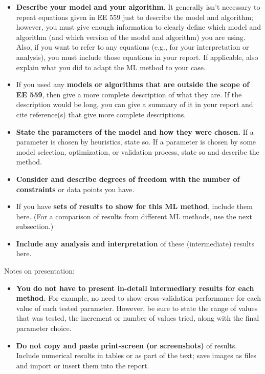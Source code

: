 \documentclass[singlecolumn]{article}
\begin{document}
\begin{itemize}
	\item \textbf{Describe your model and your algorithm}. It generally isn't necessary to repeat equations given in EE 559 just to describe the model and algorithm; however, you must give enough information to clearly define which model and algorithm (and which version of the model and algorithm) you are using. Also, if you want to refer to any equations (e.g., for your interpretation or analysis), you must include those equations in your report. If applicable, also explain what you did to adapt the ML method to your case. 
	\item If you used any \textbf{models or algorithms that are outside the scope of EE 559}, then give a more complete description of what they are.  If the description would be long, you can give a summary of it in your report and cite reference(s) that give more complete descriptions.
	\item \textbf{State the parameters of the model and how they were chosen.} If a parameter is chosen by heuristics, state so. If a parameter is chosen by some model selection, optimization, or validation process, state so and describe the method. 
	\item \textbf{Consider and describe degrees of freedom with the number of constraints} or data points you have. 
	\item If you have \textbf{sets of results to show for this ML method}, include them here. (For a comparison of results from different ML methods, use the next subsection.) 
	\item \textbf{Include any analysis and interpretation} of these (intermediate) results here.
\end{itemize}

Notes on presentation:
\begin{itemize}
	\item \textbf{You do not have to present in-detail intermediary results for each method.} For example, no need to show cross-validation performance for each value of each tested parameter. However, be sure to state the range of values that was tested, the increment or number of values tried, along with the final parameter choice.
	\item \textbf{Do not copy and paste print-screen (or screenshots)} of results. Include numerical results in tables or as part of the text; save images as files and import or insert them into the report.
\end{itemize}
\end{document}
